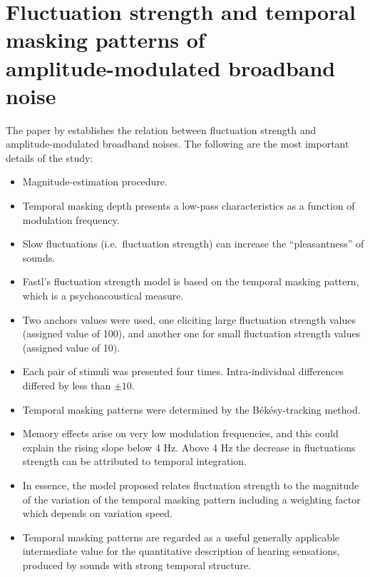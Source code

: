 \section{Fluctuation strength and temporal masking patterns of
\texorpdfstring{\\}{} amplitude-modulated broadband noise}

The paper by \citet{Fastl1982Fluctuation} establishes the relation between
fluctuation strength and amplitude-modulated broadband noises. The following
are the most important details of the study:

\begin{itemize}
    \item Magnitude-estimation procedure.
    \item Temporal masking depth presents a low-pass characteristics as a
        function of modulation frequency.
    \item Slow fluctuations (i.e.\ fluctuation strength) can increase the
        ``pleasantness'' of sounds.
    \item Fastl's fluctuation strength model is based on the temporal masking
        pattern, which is a psychoacoustical measure.
    \item  Two anchors values were used, one eliciting large fluctuation
        strength values (assigned value of 100), and another one for small
        fluctuation strength values (assigned value of 10).
    \item Each pair of stimuli was presented four times. Intra-individual
        differences differed by less than $\pm 10$.
    \item Temporal masking patterns were determined by the Békésy-tracking
        method.
    \item Memory effects arise on very low modulation frequencies, and this
        could explain the rising slope below 4 Hz. Above 4 Hz the decrease in
        fluctuations strength can be attributed to temporal integration.
    \item In essence, the model proposed relates fluctuation strength to the
        magnitude of the variation of the temporal masking pattern including a
        weighting factor which depends on variation speed.
    \item Temporal masking patterns are regarded as a useful generally
        applicable intermediate value for the quantitative description of
        hearing sensations, produced by sounds with strong temporal structure.
\end{itemize}
